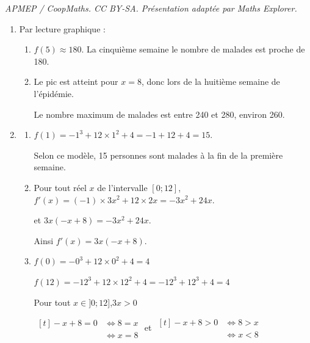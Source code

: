 \documentclass[10pt]{article}
\begin{document}
\noindent\textit{APMEP / CoopMaths. CC BY-SA. Présentation adaptée par Maths Explorer.}\par\medskip
\begin{enumerate}
\item Par lecture graphique :
	\begin{enumerate}
		\item
		$f(5)\approx 180$. \quad La cinquième semaine le nombre de malades est proche de 180.

		\item
		Le pic est atteint pour $x=8$, donc lors de la huitième semaine de l'épidémie.

		Le nombre maximum de malades est entre 240 et 280, environ 260.
	\end{enumerate}

\item
	\begin{enumerate}
		\item
		 $f(1) = - 1^{3} + 12\times 1^{2} + 4 = -1 + 12 + 4 = 15 $.

		 Selon ce modèle, 15 personnes sont malades à la fin de la première semaine.

		\item Pour tout réel $x$ de l'intervalle $[0 ; 12]$,
		\quad$f'(x)= (-1) \times 3x^2 + 12\times 2x = -3x^2+24x$.

		et \quad$3x (-x+8) = -3 x^2 + 24x$.

		Ainsi $f'(x) = 3x (-x+8)$.

		\item
		$f(0) =-0^3 + 12\times 0^{2} + 4 = 4$

		$f(12) =-12^3 + 12\times 12^{2} + 4 = -12^3 + 12^3 + 4 = 4$

		Pour tout $x\in ]0 ; 12]$,\quad  $ 3x > 0 $

		$\begin{aligned}[t]
			-x+8 = 0 &\iff 8 = x \\
			&\iff x = 8
		\end{aligned}$
		\quad et \quad
		$\begin{aligned}[t]
			-x+8 > 0 &\iff 8 > x \\&\iff x < 8
		\end{aligned}$


		\begin{center}
		\end{center}



\end{enumerate}
\end{enumerate}
\end{document}
